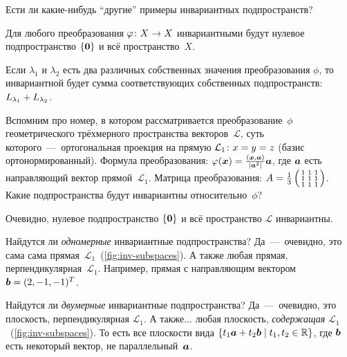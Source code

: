 \documentclass[a4paper,12pt]{article}
\begin{document}
  Ести ли какие-нибудь ``другие'' примеры инвариантных подпространств?
  
  \begin{example}
    Для любого преобразования $\phi\colon X \hm\to X$ инвариантными будут нулевое подпространство $\{\boldsymbol 0\}$ и всё пространство~$X$.
  \end{example}
  
  \begin{example}
    Если $\lambda_1$ и $\lambda_2$ есть два различных собственных значения преобразования $\phi$, то инвариантной будет сумма соответствующих собственных подпространств: $L_{\lambda_1} \hm+ L_{\lambda_2}$.
  \end{example}
  
  \begin{example}
    Вспомним про номер, в котором рассматривается преобразование~$\phi$ геометрического трёхмерного пространства векторов~$\mathcal L$, суть которого~---~ортогональная проекция на прямую $\mathcal L_1\colon x \hm= y \hm= z$ (базис ортонормированный).
    Формула преобразования:
    $
      \phi(\bds x) \hm= \frac{(\bds x, \bds a)}{|\bds a^2|} \bds a
    $,
    где $\boldsymbol a$ есть направляющий вектор прямой~$\mathcal L_1$.
    Матрица преобразования: $A \hm= \frac{1}{3} \left(\begin{smallmatrix}
      1 & 1 & 1\\
      1 & 1 & 1\\
      1 & 1 & 1
    \end{smallmatrix}\right)$.
    Какие подпространства будут инвариантны относительно~$\phi$?
    
    Очевидно, нулевое подпространство $\{\boldsymbol 0\}$ и всё пространство $\mathcal L$ инвариантны.
    
    Найдутся ли \emph{одномерные} инвариантные подпространства?
    Да~---~очевидно, это сама сама прямая~$\mathcal L_1$~(\ref{fig:inv-subspaces}).
    А также любая прямая, перпендикулярная~$\mathcal L_1$.
    Например, прямая с направляющим вектором $\boldsymbol b = (2, -1, -1)^T$.
    
    Найдутся ли \emph{двумерные} инвариантные подпространства?
    Да~---~очевидно, это плоскость, перпендикулярная $\mathcal L_1$.
    А также... любая плоскость, \emph{содержащая} $\mathcal L_1$~(\ref{fig:inv-subspaces}).
    То есть все плоскости вида $\{t_1 \bds a \hm+ t_2 \bds b \hm\mid t_1, t_2 \hm\in \RR\}$, где $\boldsymbol b$ есть некоторый вектор, не параллельный~$\boldsymbol a$.
    
    \begin{figure}[h]
      \centering
  

\end{figure}
\end{example}
\end{document}
